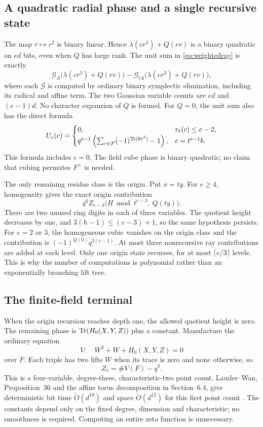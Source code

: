 \subsection{A quadratic radial phase and a single recursive state}
The map $r\mapsto r^2$ is binary linear. Hence
$\lambda(c r^3)+Q(rv)$ is a binary quadratic on $ed$ bits, even when
$Q$ has large rank. The unit sum in \eqref{eq:weightedray} is exactly
\[
 \mathcal G_A\bigl(\lambda(c r^3)+Q(rv)\bigr)
 -\mathcal G_{tA}\bigl(\lambda(c r^3)+Q(rv)\bigr),
\]
where each $\mathcal G$ is computed by ordinary binary symplectic
elimination, including its radical and affine term. The two Gaussian
variable counts are $ed$ and $(e-1)d$. No character expansion of $Q$
is formed. For $Q=0$, the unit sum also has the direct formula
\[
 U_e(c)=\begin{cases}
 0,&v_t(c)\le e-2,\\
 q^{e-1}\left(\sum_{r\in F}(-1)^{\operatorname{Tr}(br^3)}-1\right),
       &c=t^{e-1}b.
 \end{cases}
\]
This formula includes $c=0$. The field cube phase is binary quadratic;
no claim that cubing permutes $F^\times$ is needed.

The only remaining residue class is the origin. Put $x=ty$.
For $e\ge4$, homogeneity gives the exact origin contribution
\[
 q^6 Z_{e-3}\bigl(H\bmod t^{e-3},\ Q(ty)\bigr).
\]
There are two unused ring digits in each of three variables. The
quotient height decreases by one, and
$3(h-1)\le(e-3)+1$, so the same hypothesis persists.
For $e=2$ or $3$, the homogeneous cubic vanishes on the origin class
and the contribution is
$(-1)^{Q(0)}q^{3(e-1)}$.
At most three nonrecursive ray contributions are added at each level.
Only one origin state recurses, for at most $\lceil e/3\rceil$ levels.
This is why the number of computations is polynomial rather than an
exponentially branching lift tree.

\subsection{The finite-field terminal}\label{sec:fieldterminal}
When the origin recursion reaches depth one, the allowed quotient
height is zero. The remaining phase is
$\operatorname{Tr}(H_0(X,Y,Z))$ plus a constant. Manufacture the ordinary equation
\[
 V:\quad W^2+W+H_0(X,Y,Z)=0
\]
over $F$. Each triple has two lifts $W$ when its trace is zero and
none otherwise, so
\[
 Z_1=\#V(F)-q^3.
\]
This is a four-variable, degree-three, characteristic-two point count.
Lauder--Wan, Proposition~36 and the affine torus decomposition in
Section~6.4, give deterministic bit time $\widetilde O(d^{19})$ and
space $\widetilde O(d^{12})$ for this first point count \cite{lauderwan}.
The constants depend only on the fixed degree, dimension and characteristic;
no smoothness is required. Computing an entire zeta function is unnecessary.

